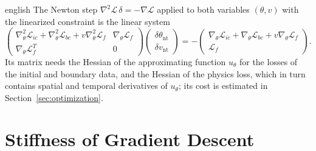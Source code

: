 \documentclass[12pt,letterpaper,twoside]{book}
\newcommand{\Loss}{\mathcal{L}}
\begin{document}
\begin{hyphenrules}{english}
The Newton step $\nabla^2\mathscr{L}\,\delta=-\nabla\mathscr{L}$ applied to both variables $(\theta,v)$
with the linearized constraint is the linear system \cite{boyd2004}
\begin{equation}
  \begin{pmatrix}
    \nabla^2_\theta\Loss_{ic}+\nabla^2_\theta\Loss_{bc}+v\nabla^2_\theta\Loss_f & \nabla_\theta\Loss_f\\
    \nabla_\theta\Loss_f^{T} & 0
  \end{pmatrix}
  \begin{pmatrix}\delta\theta_{\mathrm{nt}}\\ \delta v_{\mathrm{nt}}\end{pmatrix}
  =-\begin{pmatrix}\nabla_\theta\Loss_{ic}+\nabla_\theta\Loss_{bc}+v\nabla_\theta\Loss_f\\ \Loss_f\end{pmatrix}.
  \label{eq:newton-system}
\end{equation}
Its matrix needs the Hessian of the approximating function $u_\theta$ for the losses of the initial and
boundary data, and the Hessian of the physics loss, which in turn contains spatial and temporal
derivatives of $u_\theta$; its cost is estimated in Section~\ref{sec:optimization}.

\section{Stiffness of Gradient Descent}\label{app-sec:stiffness}


\end{hyphenrules}
\end{document}
